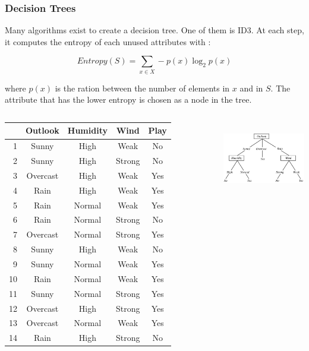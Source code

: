 \documentclass{beamer}
\begin{document}
\begin{frame}
\frametitle{Decision Trees}
  Many algorithms exist to create a decision tree. One of them is ID3. At each
  step, it computes the entropy of each unused attributes  with :

  \begin{equation*}
    Entropy(S) = \sum_{x \in X} -p(x) \log_{2}p(x)
  \end{equation*}

  where $p(x)$ is the ration between the number of elements in $x$ and in $S$.
  The attribute that has the lower entropy is chosen as a node in the tree.

  \begin{columns}
    \begin{table}[htb]
      \centering
      \tiny
        \begin{tabular}{@{}rcccc@{}}
        \cmidrule{2-5}
           & Outlook  & Humidity & Wind   & Play\\
        \midrule
        1  & Sunny    & High     & Weak   & No  \\
        2  & Sunny    & High     & Strong & No  \\
        3  & Overcast & High     & Weak   & Yes \\
        4  & Rain     & High     & Weak   & Yes \\
        5  & Rain     & Normal   & Weak   & Yes \\
        6  & Rain     & Normal   & Strong & No  \\
        7  & Overcast & Normal   & Strong & Yes \\
        8  & Sunny    & High     & Weak   & No  \\
        9  & Sunny    & Normal   & Weak   & Yes \\
        10 & Rain     & Normal   & Weak   & Yes \\
        11 & Sunny    & Normal   & Strong & Yes \\
        12 & Overcast & High     & Strong & Yes \\
        13 & Overcast & Normal   & Weak   & Yes \\
        14 & Rain     & High     & Strong & No  \\
        \bottomrule
      \end{tabular}
      \normalsize
    \end{table}

      \centering
      \includegraphics[height=3.2cm]{img/ID3.png}
  \end{columns}
\end{frame}
\end{document}
